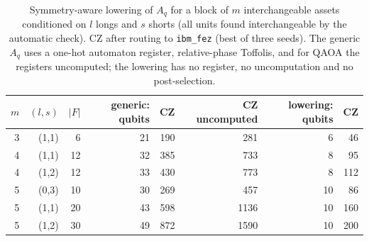 \begin{table}[t]
\centering\footnotesize\setlength{\tabcolsep}{3.5pt}
\caption{ Symmetry-aware lowering of $A_q$ for a block of $m$ interchangeable assets conditioned on $l$ longs and $s$ shorts (all units found interchangeable by the automatic check). CZ after routing to \texttt{ibm\_fez} (best of three seeds). The generic $A_q$ uses a one-hot automaton register, relative-phase Toffolis, and for QAOA the registers uncomputed; the lowering has no register, no uncomputation and no post-selection.}\label{tab:large_symmetry}
\begin{tabular}{rrrrrrrr}
\toprule
$m$ & $(l,s)$ & $|F|$ & generic: qubits & CZ & CZ uncomputed & lowering: qubits & CZ\\
\midrule
3 & (1,1) & 6 & 21 & 190 & 281 & 6 & 46\\
4 & (1,1) & 12 & 32 & 385 & 733 & 8 & 95\\
4 & (1,2) & 12 & 33 & 430 & 773 & 8 & 112\\
5 & (0,3) & 10 & 30 & 269 & 457 & 10 & 86\\
5 & (1,1) & 20 & 43 & 598 & 1136 & 10 & 160\\
5 & (1,2) & 30 & 49 & 872 & 1590 & 10 & 200\\
\bottomrule
\end{tabular}
\end{table}
